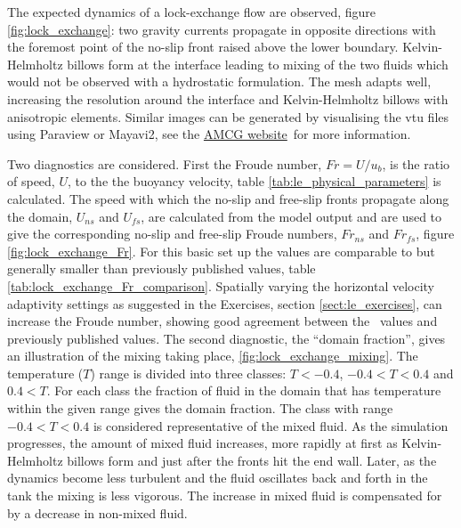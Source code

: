 The expected dynamics of a lock-exchange flow are observed, figure \ref{fig:lock_exchange}: two gravity currents propagate in opposite directions with the foremost point of the no-slip front raised above the lower boundary. Kelvin-Helmholtz billows form at the interface leading to mixing of the two fluids which would not be observed with a hydrostatic formulation. The mesh adapts well, increasing the resolution around the interface and Kelvin-Helmholtz billows with anisotropic elements. Similar images can be generated by visualising the vtu files using Paraview or Mayavi2, see the \href{http://amcg-www.ese.ic.ac.uk/}{AMCG website}\ for more information.

Two diagnostics are considered. First the Froude number, $Fr = U/u_b$, is the ratio of speed, $U$, to the the buoyancy velocity, table \ref{tab:le_physical_parameters} is calculated. The speed with which the no-slip and free-slip fronts propagate along the domain, $U_{ns}$ and $U_{fs}$, are calculated from the model output and are used to give the corresponding no-slip and free-slip Froude numbers, $Fr_{ns}$ and $Fr_{fs}$, figure \ref{fig:lock_exchange_Fr}. For this basic set up the values are comparable to but generally smaller than previously published values, table \ref{tab:lock_exchange_Fr_comparison}. Spatially varying the horizontal velocity adaptivity settings as suggested in the Exercises, section \ref{sect:le_exercises}, can increase the Froude number, showing good agreement between the \fluidity\ values and previously published values. The second diagnostic, the ``domain fraction'', gives an illustration of the mixing taking place, \ref{fig:lock_exchange_mixing}. The temperature ($T$) range is divided into three classes: $T<-0.4$, $-0.4<T<0.4$ and $0.4<T$. For each class the fraction of fluid in the domain that has temperature within the given range gives the domain fraction. The class with range $-0.4<T<0.4$ is considered representative of the mixed fluid. As the simulation progresses, the amount of mixed fluid increases, more rapidly at first as Kelvin-Helmholtz billows form and just after the fronts hit the end wall. Later, as the dynamics become less turbulent and the fluid oscillates back and forth in the tank the mixing is less vigorous. The increase in mixed fluid is compensated for by a decrease in non-mixed fluid.

